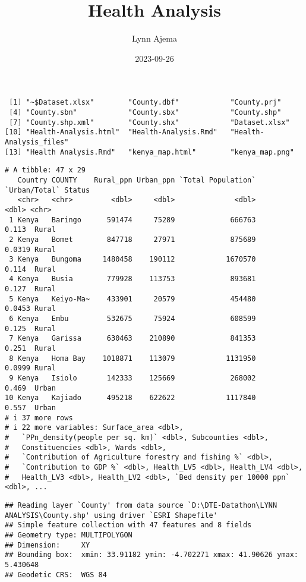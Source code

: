 \documentclass[
]{article}
\title{Health Analysis}
\author{Lynn Ajema}
\date{2023-09-26}
\begin{document}
\maketitle

\begin{verbatim}
 [1] "~$Dataset.xlsx"        "County.dbf"            "County.prj"           
 [4] "County.sbn"            "County.sbx"            "County.shp"           
 [7] "County.shp.xml"        "County.shx"            "Dataset.xlsx"         
[10] "Health-Analysis.html"  "Health-Analysis.Rmd"   "Health-Analysis_files"
[13] "Health Analysis.Rmd"   "kenya_map.html"        "kenya_map.png"        
\end{verbatim}

\begin{verbatim}
# A tibble: 47 x 29
   Country COUNTY    Rural_ppn Urban_ppn `Total Population` `Urban/Total` Status
   <chr>   <chr>         <dbl>     <dbl>              <dbl>         <dbl> <chr> 
 1 Kenya   Baringo      591474     75289             666763        0.113  Rural 
 2 Kenya   Bomet        847718     27971             875689        0.0319 Rural 
 3 Kenya   Bungoma     1480458    190112            1670570        0.114  Rural 
 4 Kenya   Busia        779928    113753             893681        0.127  Rural 
 5 Kenya   Keiyo-Ma~    433901     20579             454480        0.0453 Rural 
 6 Kenya   Embu         532675     75924             608599        0.125  Rural 
 7 Kenya   Garissa      630463    210890             841353        0.251  Rural 
 8 Kenya   Homa Bay    1018871    113079            1131950        0.0999 Rural 
 9 Kenya   Isiolo       142333    125669             268002        0.469  Urban 
10 Kenya   Kajiado      495218    622622            1117840        0.557  Urban 
# i 37 more rows
# i 22 more variables: Surface_area <dbl>,
#   `PPn_density(people per sq. km)` <dbl>, Subcounties <dbl>,
#   Constituencies <dbl>, Wards <dbl>,
#   `Contribution of Agriculture forestry and fishing %` <dbl>,
#   `Contribution to GDP %` <dbl>, Health_LV5 <dbl>, Health_LV4 <dbl>,
#   Health_LV3 <dbl>, Health_LV2 <dbl>, `Bed density per 10000 ppn` <dbl>, ...
\end{verbatim}

\begin{verbatim}
## Reading layer `County' from data source `D:\DTE-Datathon\LYNN ANALYSIS\County.shp' using driver `ESRI Shapefile'
## Simple feature collection with 47 features and 8 fields
## Geometry type: MULTIPOLYGON
## Dimension:     XY
## Bounding box:  xmin: 33.91182 ymin: -4.702271 xmax: 41.90626 ymax: 5.430648
## Geodetic CRS:  WGS 84
\end{verbatim}
\end{document}
